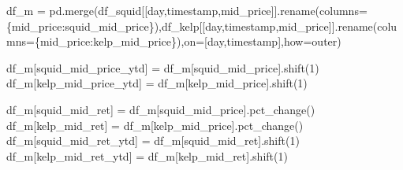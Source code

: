 \documentclass[
  letterpaper,
  DIV=11,
  numbers=noendperiod]{scrartcl}
\newenvironment{Shaded}{\begin{snugshade}}{\end{snugshade}}
\newcommand{\DecValTok}[1]{\textcolor[rgb]{0.68,0.00,0.00}{#1}}
\newcommand{\NormalTok}[1]{\textcolor[rgb]{0.00,0.23,0.31}{#1}}
\newcommand{\OperatorTok}[1]{\textcolor[rgb]{0.37,0.37,0.37}{#1}}
\newcommand{\StringTok}[1]{\textcolor[rgb]{0.13,0.47,0.30}{#1}}
\begin{document}
\begin{Shaded}
\begin{Highlighting}[]
\NormalTok{df\_m }\OperatorTok{=}\NormalTok{ pd.merge(df\_squid[[}\StringTok{\textquotesingle{}day\textquotesingle{}}\NormalTok{,}\StringTok{\textquotesingle{}timestamp\textquotesingle{}}\NormalTok{,}\StringTok{\textquotesingle{}mid\_price\textquotesingle{}}\NormalTok{]].rename(columns}\OperatorTok{=}\NormalTok{\{}\StringTok{\textquotesingle{}mid\_price\textquotesingle{}}\NormalTok{:}\StringTok{\textquotesingle{}squid\_mid\_price\textquotesingle{}}\NormalTok{\}),df\_kelp[[}\StringTok{\textquotesingle{}day\textquotesingle{}}\NormalTok{,}\StringTok{\textquotesingle{}timestamp\textquotesingle{}}\NormalTok{,}\StringTok{\textquotesingle{}mid\_price\textquotesingle{}}\NormalTok{]].rename(columns}\OperatorTok{=}\NormalTok{\{}\StringTok{\textquotesingle{}mid\_price\textquotesingle{}}\NormalTok{:}\StringTok{\textquotesingle{}kelp\_mid\_price\textquotesingle{}}\NormalTok{\}),on}\OperatorTok{=}\NormalTok{[}\StringTok{\textquotesingle{}day\textquotesingle{}}\NormalTok{,}\StringTok{\textquotesingle{}timestamp\textquotesingle{}}\NormalTok{],how}\OperatorTok{=}\StringTok{\textquotesingle{}outer\textquotesingle{}}\NormalTok{)}
\end{Highlighting}
\end{Shaded}

\begin{Shaded}
\begin{Highlighting}[]
\NormalTok{df\_m[}\StringTok{\textquotesingle{}squid\_mid\_price\_ytd\textquotesingle{}}\NormalTok{] }\OperatorTok{=}\NormalTok{ df\_m[}\StringTok{\textquotesingle{}squid\_mid\_price\textquotesingle{}}\NormalTok{].shift(}\DecValTok{1}\NormalTok{)}
\NormalTok{df\_m[}\StringTok{\textquotesingle{}kelp\_mid\_price\_ytd\textquotesingle{}}\NormalTok{] }\OperatorTok{=}\NormalTok{ df\_m[}\StringTok{\textquotesingle{}kelp\_mid\_price\textquotesingle{}}\NormalTok{].shift(}\DecValTok{1}\NormalTok{)}
\end{Highlighting}
\end{Shaded}

\begin{Shaded}
\begin{Highlighting}[]
\NormalTok{df\_m[}\StringTok{\textquotesingle{}squid\_mid\_ret\textquotesingle{}}\NormalTok{] }\OperatorTok{=}\NormalTok{ df\_m[}\StringTok{\textquotesingle{}squid\_mid\_price\textquotesingle{}}\NormalTok{].pct\_change()}
\NormalTok{df\_m[}\StringTok{\textquotesingle{}kelp\_mid\_ret\textquotesingle{}}\NormalTok{] }\OperatorTok{=}\NormalTok{ df\_m[}\StringTok{\textquotesingle{}kelp\_mid\_price\textquotesingle{}}\NormalTok{].pct\_change()}
\NormalTok{df\_m[}\StringTok{\textquotesingle{}squid\_mid\_ret\_ytd\textquotesingle{}}\NormalTok{] }\OperatorTok{=}\NormalTok{ df\_m[}\StringTok{\textquotesingle{}squid\_mid\_ret\textquotesingle{}}\NormalTok{].shift(}\DecValTok{1}\NormalTok{)}
\NormalTok{df\_m[}\StringTok{\textquotesingle{}kelp\_mid\_ret\_ytd\textquotesingle{}}\NormalTok{] }\OperatorTok{=}\NormalTok{ df\_m[}\StringTok{\textquotesingle{}kelp\_mid\_ret\textquotesingle{}}\NormalTok{].shift(}\DecValTok{1}\NormalTok{)}
\end{Highlighting}
\end{Shaded}
\end{document}

